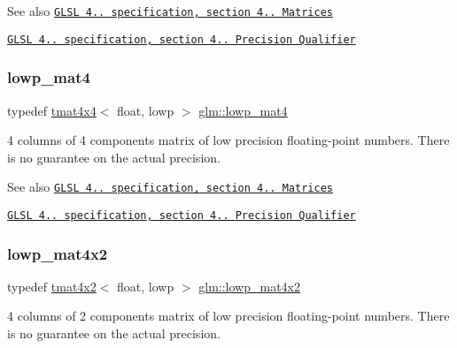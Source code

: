 \begin{DoxySeeAlso}{See also}
\href{http://www.opengl.org/registry/doc/GLSLangSpec.4.20.8.pdf}{\tt G\+L\+SL 4.. specification, section 4.. Matrices} 

\href{http://www.opengl.org/registry/doc/GLSLangSpec.4.20.8.pdf}{\tt G\+L\+SL 4.. specification, section 4.. Precision Qualifier} 
\end{DoxySeeAlso}
\mbox{\label{group__core__precision_ga070380d2efa0c37d16f8677412518e02}} 
\subsubsection{\texorpdfstring{lowp\+\_\+mat4}{lowp\_mat4}}
{\footnotesize\ttfamily typedef \hyperlink{structglm_1_1tmat4x4}{tmat4x4}$<$ float, lowp $>$ \hyperlink{group__core__precision_ga070380d2efa0c37d16f8677412518e02}{glm\+::lowp\+\_\+mat4}}

4 columns of 4 components matrix of low precision floating-\/point numbers. There is no guarantee on the actual precision.

\begin{DoxySeeAlso}{See also}
\href{http://www.opengl.org/registry/doc/GLSLangSpec.4.20.8.pdf}{\tt G\+L\+SL 4.. specification, section 4.. Matrices} 

\href{http://www.opengl.org/registry/doc/GLSLangSpec.4.20.8.pdf}{\tt G\+L\+SL 4.. specification, section 4.. Precision Qualifier} 
\end{DoxySeeAlso}
\mbox{\label{group__core__precision_gaae545974fa5b7fcb9574ea67f8922c50}} 
\subsubsection{\texorpdfstring{lowp\+\_\+mat4x2}{lowp\_mat4x2}}
{\footnotesize\ttfamily typedef \hyperlink{structglm_1_1tmat4x2}{tmat4x2}$<$ float, lowp $>$ \hyperlink{group__core__precision_gaae545974fa5b7fcb9574ea67f8922c50}{glm\+::lowp\+\_\+mat4x2}}

4 columns of 2 components matrix of low precision floating-\/point numbers. There is no guarantee on the actual precision.

